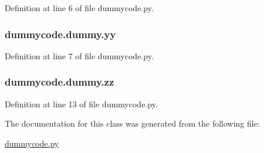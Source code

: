 Definition at line 6 of file dummycode.\-py.

\subsubsection[{yy}]{\setlength{\rightskip}{0pt plus 5cm}dummycode.\-dummy.\-yy}\label{classdummycode_1_1dummy_ad0f056c4695b2525f883dbe1004fa7ba}


Definition at line 7 of file dummycode.\-py.

\subsubsection[{zz}]{\setlength{\rightskip}{0pt plus 5cm}dummycode.\-dummy.\-zz}\label{classdummycode_1_1dummy_af5c829ccdb5a89e8ba0f2cf476cb2aa0}


Definition at line 13 of file dummycode.\-py.



The documentation for this class was generated from the following file\-:\begin{DoxyCompactItemize}
\item 
\hyperlink{dummycode_8py}{dummycode.\-py}\end{DoxyCompactItemize}
